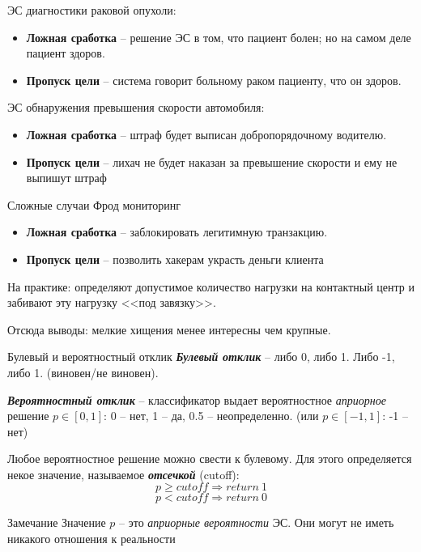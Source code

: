 \documentclass{beamer}
\newcommand{\termdef}[1]{\textbf{\textit{#1}}}
\newcommand{\term}{\textit}
\begin{document}
  \begin{frame}
  ЭС диагностики раковой опухоли:
  \begin{itemize}
    \item \textbf{Ложная сработка} -- 
    решение ЭС в том, что пациент болен; но на самом деле пациент здоров.
    \item \textbf{Пропуск цели}
    -- система говорит больному раком пациенту, что он здоров.
  \end{itemize}
  
  ЭС обнаружения превышения скорости автомобиля:
  \begin{itemize}
    \item \textbf{Ложная сработка}
    -- штраф будет выписан добропорядочному водителю.
    \item \textbf{Пропуск цели}
    -- лихач не будет наказан за превышение скорости и ему не выпишут штраф
  \end{itemize}
  \end{frame}
  
  \begin{frame}{Сложные случаи}
  Фрод мониторинг
  \begin{itemize}
  	\item \textbf{Ложная сработка}
  	-- заблокировать легитимную транзакцию.
  	\item \textbf{Пропуск цели}
  	-- позволить хакерам украсть деньги клиента
  \end{itemize}
  
  На практике: определяют допустимое количество нагрузки на контактный центр и 
  забивают эту нагрузку <<под завязку>>.
  
  Отсюда выводы: мелкие хищения менее интересны чем крупные.
  \end{frame}

  \begin{frame}{Булевый и вероятностный отклик}
  \small
  \termdef{Булевый отклик} -- либо 0, либо 1. Либо -1, либо 1. (виновен/не виновен).
  
  \termdef{Вероятностный отклик} -- классификатор выдает вероятностное 
  \term{априорное} решение $p \in [0, 1]$:
  0 -- нет, 1 -- да, 0.5 -- неопределенно.
  (или $p \in [-1, 1]$: -1 --нет)
  
  Любое вероятностное решение можно свести к булевому.
  Для этого определяется некое значение, называемое
  \termdef{отсечкой} (cutoff):
  \begin{equation}
  p \geqslant cutoff \Longrightarrow return ~ 1
  \end{equation}
  \begin{equation*}
  p < cutoff \Longrightarrow return ~ 0
  \end{equation*}
  
  \begin{block}{Замечание}
  Значение $p$ -- это \term{априорные вероятности} ЭС.
  Они могут не иметь никакого отношения к реальности
  \end{block}
  \end{frame}
\end{document}
